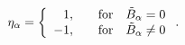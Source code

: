 \begin{equation}
\eta _{\alpha }=\left\{
\begin{array}{rl}
1, & \quad {\rm for}\quad \tilde B_{\alpha }=0 \\
-1, & \quad {\rm for}\quad \tilde B_{\alpha }\neq 0
\end{array}
\right. .  \label{etaalpha}
\end{equation}

